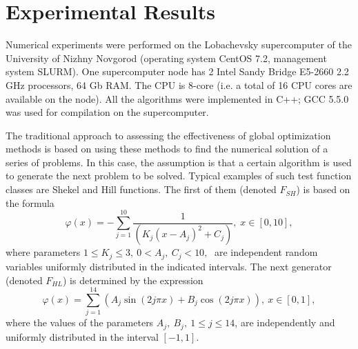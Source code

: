 \documentclass[entropy,article,submit,moreauthors,pdftex]{Definitions/mdpi}
\begin{document}



\section{Experimental Results}

Numerical experiments were performed on the Lobachevsky supercomputer of the University of Nizhny Novgorod (operating system CentOS 7.2, management system SLURM). One supercomputer node has 2 Intel Sandy Bridge E5-2660 2.2 GHz processors, 64 Gb RAM. The CPU is 8-core (i.e. a total of 16 CPU cores are available on the node). All the algorithms were implemented in C++; GCC 5.5.0 was used for compilation on the supercomputer.

The traditional approach to assessing the effectiveness of global optimization methods is based on using these methods to find the numerical solution of a series of problems. 
In this case, the assumption is that a certain algorithm is used to generate the next problem to be solved. 
Typical examples of such test function classes are Shekel and Hill functions. 
The first of them (denoted $F_{SH}$) is based on the formula
\begin{equation}\label{shekel}
  \varphi(x)=-\sum_{j=1}^{10}\frac{1}{(K_j(x-A_j)^2+C_j)},\;  x\in[0,10],
\end{equation}
where parameters $1\le K_j\le 3,\: 0 < A_j,\: C_j < 10, \;$ are independent random variables uniformly distributed in the indicated intervals. 
The next generator (denoted   $F_{HL}$) is determined by the expression
\begin{equation}\label{hill}
  \varphi(x)=\sum_{j=1}^{14}(A_j\sin(2j\pi x) + B_j\cos(2j\pi x)),\: x\in[0,1],
\end{equation}
where the values of the parameters $A_j,\: B_j,\: 1 \le j \le 14$, are independently and uniformly distributed in the interval  $[-1,1]$. 
\end{document}

